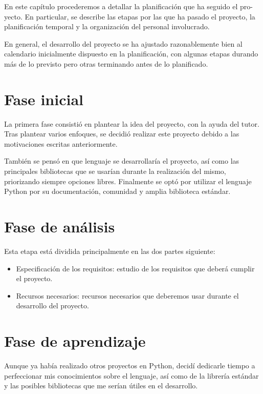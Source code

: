En este capítulo procederemos a detallar la planificación que ha seguido el pro-
yecto. En particular, se describe las etapas por las que
ha pasado el proyecto, la planificación temporal y la organización del personal
involucrado.

En general, el desarrollo del proyecto se ha ajustado razonablemente bien al calendario
inicialmente dispuesto en la planificación, con algunas etapas durando
más de lo previsto pero otras terminando antes de lo planificado.

\section{Fase inicial}

La primera fase consistió en plantear la idea del proyecto, con la ayuda del tutor. Tras plantear
varios enfoques, se decidió realizar este proyecto debido a las motivaciones escritas anteriormente.

También se pensó en que lenguaje se desarrollaría el proyecto, así como las principales bibliotecas que
se usarían durante la realización del mismo, priorizando siempre opciones libres. Finalmente se optó por
utilizar el lenguaje Python por su documentación, comunidad y amplia biblioteca estándar.

\section{Fase de análisis}

Esta etapa está dividida principalmente en las dos partes siguiente:

\begin{itemize}
\item Especificación de los requisitos: estudio de los requisitos que deberá cumplir el proyecto.
\item Recursos necesarios: recursos necesarios que deberemos usar durante el desarrollo del proyecto.
\end{itemize}

\section{Fase de aprendizaje}

Aunque ya había realizado otros proyectos en Python, decidí dedicarle tiempo a perfeccionar mis conocimientos
sobre el lenguaje, así como de la librería estándar y las posibles bibliotecas que me serían útiles en el desarrollo.

